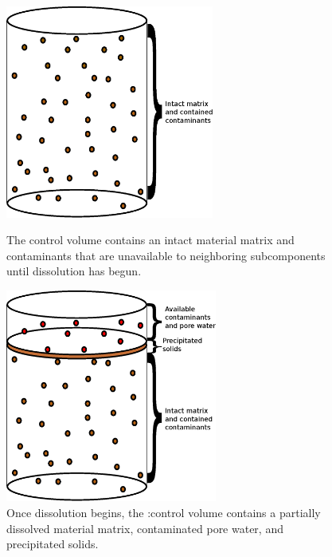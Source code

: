 \begin{figure}[h!]
\begin{minipage}[b]{0.5\linewidth}
  \begin{center}
    \includegraphics[height=7cm]{./chapters/nuclide_models/mixed_cell/mixed_cell_whole.eps}
  \end{center}
  \caption[Intact Mixed Cell Control Volume]{The control volume contains an 
  intact material matrix and contaminants that are unavailable to neighboring 
  subcomponents until dissolution has begun.}
  \label{fig:intact}
\end{minipage}
\hspace{0.5cm}
\begin{minipage}[b]{0.5\linewidth}
  \begin{center}
    \includegraphics[height=7cm]{./chapters/nuclide_models/mixed_cell/mixed_cell_degraded.eps}
  \end{center}
  \caption[Degrading Mixed Cell Control Volume]{Once dissolution begins, the 
  :control volume contains a partially dissolved material matrix, contaminated 
  pore water, and precipitated solids.}
  \label{fig:dissolved}
\end{minipage}
\end{figure}


